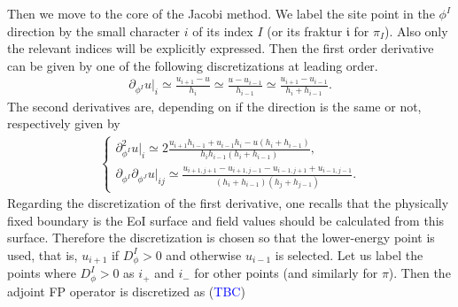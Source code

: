 \documentclass[aps, prd
, preprint
, nofootinbib 
, longbibliography
]{revtex4-1}
\newcommand{\dps}{\displaystyle}
\newcommand{\bae}[1]{\begin{align} #1 \end{align}}
\newcommand{\bce}[1]{\begin{cases} #1 \end{cases}}
\newcommand{\Blue}[1]{\textcolor{blue}{\sffamily #1}}
\begin{document}
Then we move to the core of the Jacobi method. We label the site point in the $\phi^I$ direction by the small character $i$ of its index $I$ 
(or its fraktur $\mathfrak{i}$ for $\pi_I$). Also only the relevant indices will be explicitly expressed.
Then the first order derivative can be given by one of the following discretizations at leading order.
\bae{
	\partial_{\phi^I}u|_i\simeq\frac{u_{i+1}-u}{h_i}
	\simeq\frac{u-u_{i-1}}{h_{i-1}}
	\simeq\frac{u_{i+1}-u_{i-1}}{h_i+h_{i-1}}.
}
The second derivatives are, depending on if the direction is the same or not, respectively given by
\bae{
	 \bce{
	 	\dps
		\partial_{\phi^I}^2u|_i\simeq2\frac{u_{i+1}h_{i-1}+u_{i-1}h_i-u(h_i+h_{i-1})}{h_ih_{i-1}(h_i+h_{i-1})}, \\
		\dps
		\partial_{\phi^I}\partial_{\phi^J}u|_{ij}\simeq\frac{u_{i+1,j+1}-u_{i+1,j-1}-u_{i-1,j+1}+u_{i-1,j-1}}{(h_i+h_{i-1})(h_j+h_{j-1})}.
	}
}
Regarding the discretization of the first derivative, one recalls that the physically fixed boundary is the EoI surface and field values should be calculated 
from this surface. Therefore the discretization is chosen so that the lower-energy point is used, that is, $u_{i+1}$ if $D^I_\phi>0$ and otherwise $u_{i-1}$ is selected.
Let us label the points where $D_\phi^I>0$ as $i_+$ and $i_-$ for other points (and similarly for $\pi$). Then the adjoint FP operator is discretized as (\Blue{TBC})
\end{document}
